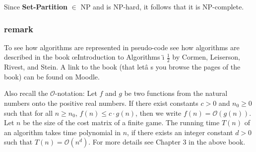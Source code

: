 Since \textbf{Set-Partition} $\in $ NP and is NP-hard, it follows that it is
NP-complete.


\subsubsection{remark}
To see how algorithms are represented in pseudo-code see how algorithms are
described in the book  \oe Introduction to Algorithms
\"{\i}\textquestiondown 
$\frac12$
by Cormen, Leiserson, Rivest, and Stein. A link to the book (that let\^{a}%
\texttrademark s you browse the pages of the book) can be found on
Moodle.

Also recall the $\mathcal{O}$-notation: Let $f$ and $g$ be two functions
from the natural numbers onto the positive real numbers. If there exist
constants $c>0$ and $n_{0}\geq 0$ such that for all $n\geq n_{0}$, $f(n)\leq
c\cdot g(n)$, then we write $f(n)=\mathcal{O}(g(n))$. Let $n$ be the size of
the cost matrix of a finite game. The running time $T(n)$ of an algorithm
takes time polynomial in $n$, if there exists an integer constant $d>0$ such
that $T(n)=\mathcal{O}(n^{d})$. For more details see Chapter 3 in the above
book.

% 

